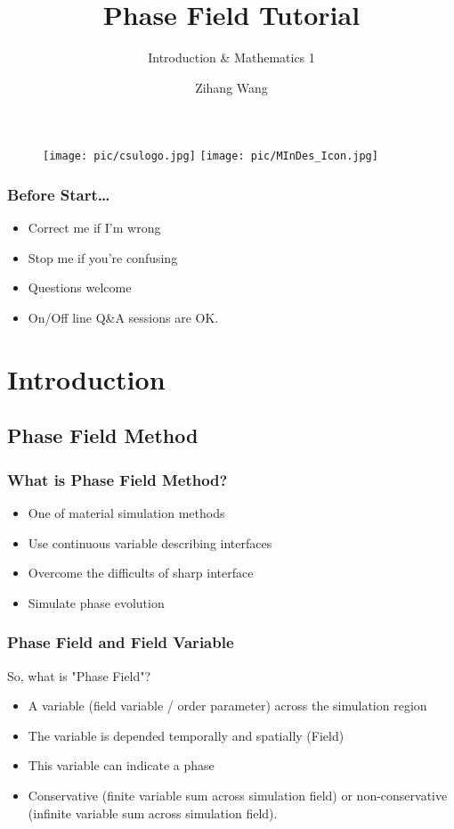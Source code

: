 \documentclass[compress]{beamer}
\author{Zihang Wang}
\title{Phase Field Tutorial}
\subtitle{Introduction \& Mathematics 1}
\institute{Central South University}
\begin{document}
\begin{frame}
  \titlepage
  \begin{figure}[!h]
    \centering
    \texttt{[image: pic/csulogo.jpg]}
    \texttt{[image: pic/MInDes\_Icon.jpg]}
  \end{figure}
\end{frame}

\begin{frame}
  \frametitle{Before Start\dots}
  \begin{itemize}
    \item Correct me if I'm wrong
    \item Stop me if you're confusing
    \item Questions welcome
    \item On/Off line Q\&A sessions are OK.
  \end{itemize}
\end{frame}


\begin{frame}
  \tableofcontents[currentsection, hideothersubsections, sectionstyle=show/show]
\end{frame}

\section{Introduction}
\subsection{{Phase Field Method}}

\begin{frame}
  \frametitle{What is Phase Field Method?}
  \begin{itemize}
    \item One of material simulation methods
    \item Use continuous variable describing interfaces
    \item Overcome the difficults of sharp interface
    \item Simulate phase evolution
  \end{itemize}
\end{frame}

\begin{frame}
  \frametitle{Phase Field and Field Variable}
  So, what is "Phase Field"?
  \begin{itemize}
    \item A variable (field variable / order parameter) across the simulation region
    \item The variable is depended temporally and spatially (Field)
    \item This variable can indicate a phase
    \item Conservative (finite variable sum across simulation field) or non-conservative (infinite variable sum across simulation field).
  \end{itemize}
\end{frame}
\end{document}
